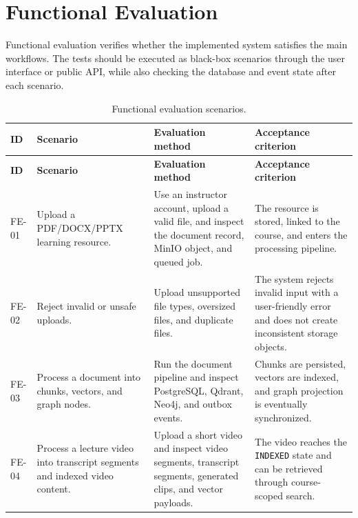 \section{Functional Evaluation}

Functional evaluation verifies whether the implemented system satisfies the
main workflows. The tests should be executed as black-box scenarios through
the user interface or public API, while also checking the database and event
state after each scenario.

\begin{longtable}{|p{1.8cm}|p{4.8cm}|p{4.0cm}|p{3.1cm}|}
    \caption{Functional evaluation scenarios.}
    \label{tab:functional-evaluation-scenarios} \\
    \hline
    \textbf{ID} & \textbf{Scenario} & \textbf{Evaluation method} & \textbf{Acceptance criterion} \\
    \hline
    \endfirsthead
    \hline
    \textbf{ID} & \textbf{Scenario} & \textbf{Evaluation method} & \textbf{Acceptance criterion} \\
    \hline
    \endhead

    FE-01
        & Upload a PDF/DOCX/PPTX learning resource.
        & Use an instructor account, upload a valid file, and inspect the
          document record, MinIO object, and queued job.
        & The resource is stored, linked to the course, and enters the
          processing pipeline. \\
    \hline

    FE-02
        & Reject invalid or unsafe uploads.
        & Upload unsupported file types, oversized files, and duplicate files.
        & The system rejects invalid input with a user-friendly error and does
          not create inconsistent storage objects. \\
    \hline

    FE-03
        & Process a document into chunks, vectors, and graph nodes.
        & Run the document pipeline and inspect PostgreSQL, Qdrant, Neo4j, and
          outbox events.
        & Chunks are persisted, vectors are indexed, and graph projection is
          eventually synchronized. \\
    \hline

    FE-04
        & Process a lecture video into transcript segments and indexed video
          content.
        & Upload a short video and inspect video segments, transcript segments,
          generated clips, and vector payloads.
        & The video reaches the \texttt{INDEXED} state and can be retrieved
          through course-scoped search. \\
    \hline


\end{longtable}
